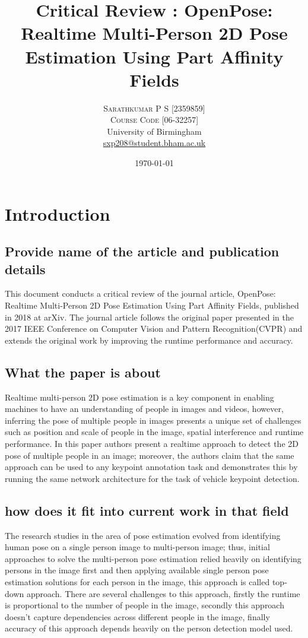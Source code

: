 \documentclass[twocolumn]{article}
\title{Critical Review : OpenPose: Realtime Multi-Person 2D Pose Estimation Using Part Affinity Fields} %
\author{%
\textsc{Sarathkumar P S [2359859]} \\[1ex] %
\textsc{Course Code [06-32257]} \\[1ex] %
\normalsize University of Birmingham \\ %
\normalsize \href{mailto:sxp208@student.bham.ac.uk}{sxp208@student.bham.ac.uk} %
}
\date{\today} %
\begin{document}
\maketitle


\section{Introduction}

\subsection{Provide name of the article and publication details}
This document conducts a critical review of the journal article, OpenPose: Realtime Multi-Person 2D Pose Estimation Using Part Affinity Fields\cite{DBLP:journals/corr/abs-1812-08008}, published in 2018 at arXiv. The journal article follows the original paper \cite{cCao_2017_CVPR} presented in the 2017 IEEE Conference on Computer Vision and Pattern Recognition(CVPR) and extends the original work by improving the runtime performance and accuracy.

\subsection{What the paper is about}
Realtime multi-person 2D pose estimation is a key component in enabling machines to have an understanding of people in images and videos, however, inferring the pose of multiple people in images presents a unique set of challenges such as position and scale of people in the image, spatial interference and runtime performance. In this paper authors present a realtime approach to detect the 2D pose of multiple people in an image; moreover, the authors claim that the same approach can be used to any keypoint annotation task and demonstrates this by running the same network architecture for the task of vehicle keypoint detection.

\subsection{how does it fit into current work in that field}
The research studies in the area of pose estimation evolved from identifying human pose on a single person image to multi-person image; thus, initial approaches to solve the multi-person pose estimation relied heavily on identifying persons in the image first and then applying available single person pose estimation solutions for each person in the image, this approach is called top-down approach. There are several challenges to this approach, firstly the runtime is proportional to the number of people in the image, secondly this approach doesn't capture dependencies across different people in the image, finally accuracy of this approach depends heavily on the person detection model used. 
\end{document}
